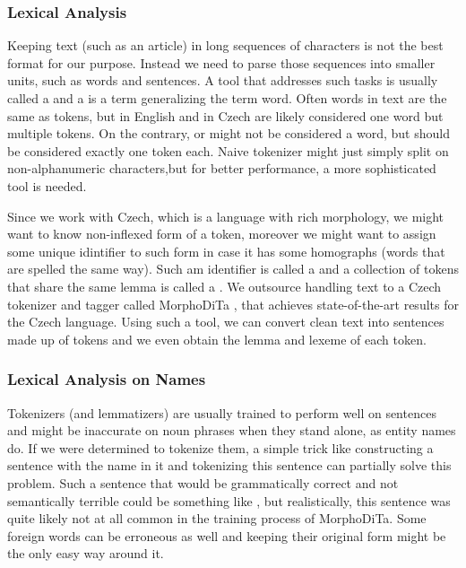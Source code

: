 \subsubsection{Lexical Analysis}
Keeping text (such as an article) in long sequences of characters is not the best format for our purpose. Instead we need to parse those sequences into smaller units, such as words and sentences. A tool that addresses such tasks is usually called a  and a  is a term generalizing the term word. Often words in text are the same as tokens, but  in English and  in Czech are likely considered one word but multiple tokens. On the contrary,  or  might not be considered a word, but should be considered exactly one token each. Naive tokenizer might just simply split on non-alphanumeric characters,but for better performance, a more sophisticated tool is needed. 

Since we work with Czech, which is a language with rich morphology, we might want to know non-inflexed form of a token, moreover we might want to assign some unique idintifier to such form in case it has some homographs (words that are spelled the same way). Such am identifier is called a  and a collection of tokens that share the same lemma is called a . 
We outsource handling text to a Czech tokenizer and tagger called MorphoDiTa \citep{Morphodita}, that achieves state-of-the-art results for the Czech language. Using such a tool, we can convert clean text into sentences made up of tokens and we even obtain the lemma and lexeme of each token.

\subsubsection{Lexical Analysis on Names}
Tokenizers (and lemmatizers) are usually trained to perform well on sentences and might be inaccurate on noun phrases when they stand alone, as entity names do. If we were determined to tokenize them, a simple trick like constructing a sentence with the name in it and tokenizing this sentence can partially solve this problem. Such a sentence that would be grammatically correct and not semantically terrible could be something like  , but realistically, this sentence was quite likely not at all common in the training process of MorphoDiTa. Some foreign words can be erroneous as well and keeping their original form might be the only easy way around it.

